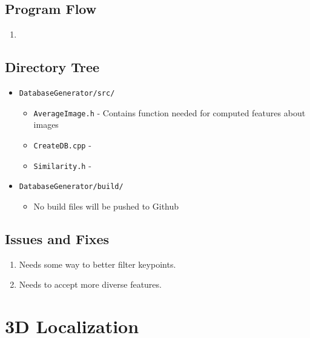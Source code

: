 \documentclass[a4paper,11pt]{article}
\begin{document}
  \subsection{Program Flow}
    \begin{enumerate}
     \item 
    \end{enumerate}
    
  \subsection{Directory Tree}
    \begin{itemize}
     \item \texttt{DatabaseGenerator/src/}
       \begin{itemize}
        \item \texttt{AverageImage.h} - Contains function needed for computed features about images
        \item \texttt{CreateDB.cpp} -
        \item \texttt{Similarity.h} -
       \end{itemize}
     \item \texttt{DatabaseGenerator/build/}
       \begin{itemize}
        \item No build files will be pushed to Github
       \end{itemize}
    \end{itemize}
    
    \subsection{Issues and Fixes}
    \begin{enumerate}
      \item Needs some way to better filter keypoints.
      \item Needs to accept more diverse features.
    \end{enumerate}
    \newpage



    

\section{3D Localization}

\end{document}
